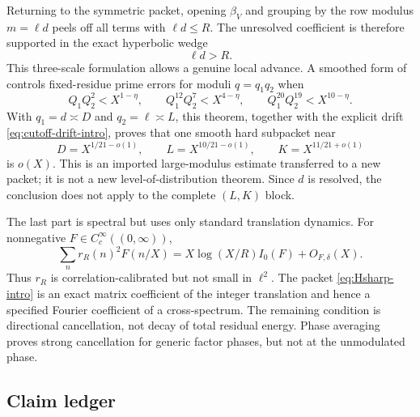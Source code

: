 Returning to the symmetric packet, opening $\beta_V$ and grouping by the
row modulus $m=\ell d$ peels off all terms with $\ell d\le R$.  The
unresolved coefficient is therefore supported in the exact hyperbolic
wedge
\begin{equation}
 \ell d>R.
 \label{eq:invisible-hyperbola-intro}
\end{equation}
This three-scale formulation allows a genuine local advance.  A smoothed
form of \citet[Theorem~1.1]{Maynard2025I} controls fixed-residue prime
errors for moduli $q=q_1q_2$ when
\begin{equation}
 Q_1Q_2^2<X^{1-\eta},\qquad
 Q_1^{12}Q_2^7<X^{4-\eta},\qquad
 Q_1^{20}Q_2^{19}<X^{10-\eta}.
 \label{eq:Maynard-polytope-intro}
\end{equation}
With $q_1=d\asymp D$ and $q_2=\ell\asymp L$, this theorem, together with
the explicit drift \eqref{eq:cutoff-drift-intro}, proves that one smooth
hard subpacket near
\begin{equation}
 D=X^{1/21-o(1)},\qquad
 L=X^{10/21-o(1)},\qquad
 K=X^{11/21+o(1)}
 \label{eq:eleven-twenty-one-scales-intro}
\end{equation}
is $o(X)$.  This is an imported large-modulus estimate transferred to a
new packet; it is not a new level-of-distribution theorem.  Since $d$ is
resolved, the conclusion does not apply to the complete $(L,K)$ block.

The last part is spectral but uses only standard translation dynamics.
For nonnegative $F\in C_c^\infty((0,\infty))$,
\begin{equation}
 \sum_n r_R(n)^2F(n/X)
 =X\log(X/R)I_0(F)+O_{F,\delta}(X).
 \label{eq:energy-law-intro}
\end{equation}
Thus $r_R$ is correlation-calibrated but not small in $\ell^2$.  The
packet \eqref{eq:Hsharp-intro} is an exact matrix coefficient of the
integer translation and hence a specified Fourier coefficient of a
cross-spectrum.  The remaining condition is directional cancellation,
not decay of total residual energy.  Phase averaging proves strong
cancellation for generic factor phases, but not at the unmodulated phase.

\subsection{Claim ledger}

